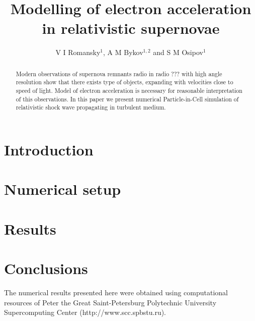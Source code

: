 \documentclass[a4paper]{jpconf}
\begin{document}
\title{Modelling of electron acceleration in relativistic supernovae}

\author{V I Romansky$^{1}$, A M Bykov$^{1,2}$ and S M Osipov$^1$}

\address{$^1$ Ioffe Institute, 26 Politekhnicheskaya st., St. Petersburg 194021, Russia}
\address{$^2$ Peter the Great St.~Petersburg Polytechnic University, 29 Politekhnicheskaya st., St. Petersburg 195251, Russia}


\begin{abstract}
	Modern observations of supernova remnants radio in radio ??? with high angle resolution show that there exists type of objects, expanding with velocities close to speed of light. Model of electron acceleration is necessary for reasonable interpretation of this observations. In this paper we present numerical Particle-in-Cell simulation of relativistic shock wave propagating in turbulent medium.
\end{abstract}
\section{Introduction}


\section{Numerical setup}

\section{Results}

\section{Conclusions}

\ack

The numerical results presented here were obtained using computational resources of Peter the Great Saint-Petersburg Polytechnic University Supercomputing Center (http://www.scc.spbstu.ru). 
\end{document}
